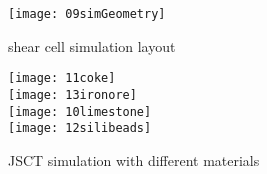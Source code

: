 \documentclass{CFD2015}
\begin{document}
\begin{figure}[!htb] 
\centering 
\texttt{[image: 09simGeometry]} 
\caption[scsim]{shear cell simulation layout}
\label{fig:09simGeometry} 
\end{figure}

\begin{figure}[!htb]
\centering
{\label{fig:11coke}%
\texttt{[image: 11coke]}} \\ %
{\label{fig:13ironore}%
\texttt{[image: 13ironore]}} \\  %
{\label{fig:10limestone}%
\texttt{[image: 10limestone]}} \\ %
{\label{fig:12silibeads}%
\texttt{[image: 12silibeads]}} \\  %
\caption[JSCT simulation]{JSCT simulation with different materials}
\label{fig:shearcellsimulationresults}
\end{figure}
\end{document}
